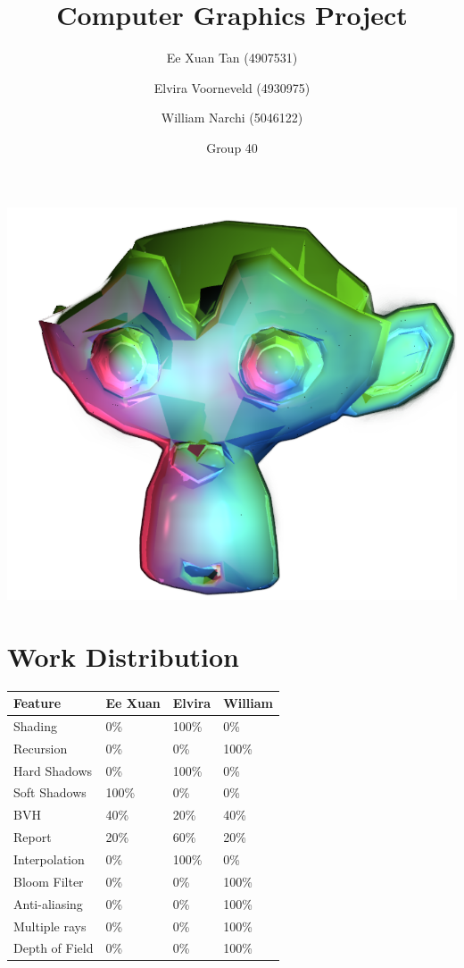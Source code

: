 \documentclass{article}
\author{Ee Xuan Tan (4907531) \and Elvira Voorneveld (4930975) \and William Narchi (5046122)}
\date{Group 40}
\title{Computer Graphics Project}
\begin{document}
    \maketitle
    \begin{center}
      \includegraphics[scale=0.60]{images/monkey_cover}
    \end{center}
    
    \newpage

    \section{Work Distribution}
    \begin{tabular}{ |p{2.5cm}||p{2.5cm}|p{2.5cm}|p{2.5cm}| }
        \hline
        \textbf{Feature} &\textbf{Ee Xuan} &\textbf{Elvira} &\textbf{William}\\
        \hline
        Shading                        &0\%    &100\%  &0\%\\
        Recursion                      &0\%    &0\%    &100\%\\
        Hard Shadows                   &0\%    &100\%  &0\%\\
        Soft Shadows                   &100\%  &0\%    &0\%\\
        BVH                            &40\%   &20\%   &40\%\\
        Report                         &20\%   &60\%   &20\%\\
        Interpolation                  &0\%    &100\%  &0\%\\
        Bloom Filter                   &0\%    &0\%    &100\%\\
        Anti-aliasing                  &0\%    &0\%    &100\%\\
        Multiple rays                  &0\%    &0\%    &100\%\\
        Depth of Field                 &0\%    &0\%    &100\%\\
        \hline
    \end{tabular}
\end{document}
